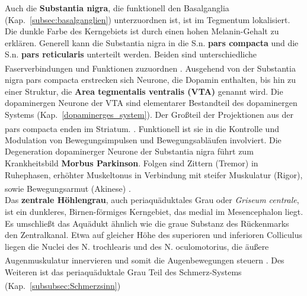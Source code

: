 \noindent Auch die \textbf{Substantia nigra}, die funktionell den Basalganglia (Kap.~\ref{subsec:basalganglien}) unterzuordnen ist, ist im Tegmentum lokalisiert. Die dunkle Farbe des Kerngebiets ist durch einen hohen Melanin-Gehalt zu erklären. Generell kann die Substantia nigra in die S.n. \textbf{pars compacta} und die S.n. \textbf{pars reticularis} unterteilt werden. Beiden sind unterschiedliche Faserverbindungen und Funktionen zuzuordnen \textsuperscript{\cite[Kap.~6]{trepel2011neuroanatomie}}. 
Ausgehend von der Substantia nigra pars compacta erstrecken sich Neurone, die Dopamin enthalten, bis hin zu einer Struktur, die \textbf{Area tegmentalis ventralis (VTA)} genannt wird. Die dopaminergen Neurone der VTA sind elementarer Bestandteil des dopaminergen Systems (Kap.~\ref{dopaminerges_system}).
Der Großteil der Projektionen aus der pars compacta enden im Striatum. \textsuperscript{\cite[Kap.~9]{crossman2014neuroanatomy}}. Funktionell ist sie in die Kontrolle und Modulation von Bewegungsimpulsen und Bewegungsabläufen involviert. Die Degeneration dopaminerger Neurone der Substantia nigra führt zum Krankheitsbild \textbf{Morbus Parkinson}. Folgen sind Zittern (Tremor) in Ruhephasen, erhöhter Muskeltonus in Verbindung mit steifer Muskulatur (Rigor), sowie Bewegungsarmut (Akinese) \textsuperscript{\cite[Kap.~6]{trepel2011neuroanatomie}}. \\

\noindent Das \textbf{zentrale Höhlengrau}, auch periaquäduktales Grau oder \textit{Griseum centrale}, ist ein dunkleres, Birnen-förmiges  Kerngebiet, das medial im Mesencephalon liegt. Es umschließt das Aquädukt ähnlich wie die graue Substanz des Rückenmarks den Zentralkanal. Etwa auf gleicher Höhe des superioren und inferioren Colliculus liegen die Nuclei des N. trochlearis und des N. oculomotorius, die äußere Augenmuskulatur innervieren und somit die Augenbewegungen steuern \textsuperscript{\cite[Kap.~9]{crossman2014neuroanatomy}}. Des Weiteren ist das periaquäduktale Grau Teil des Schmerz-Systems (Kap.~\ref{subsubsec:Schmerzsinn}) \textsuperscript{\cite[Kap.~25]{paxinos2014rat}}
